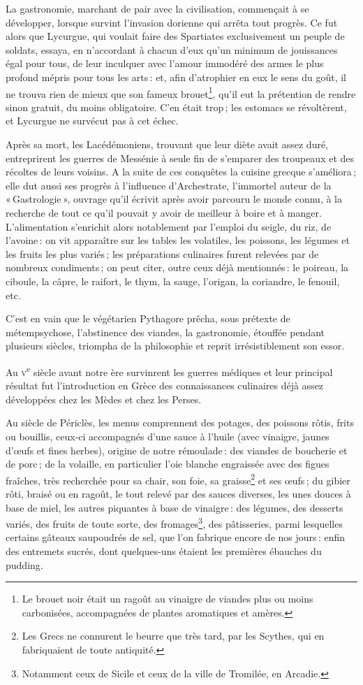 La gastronomie, marchant de pair avec la civilisation, commençait à se
développer, lorsque survint l'invasion dorienne qui arrêta tout progrès. Ce fut
alors que Lycurgue, qui voulait faire des Spartiates exclusivement un peuple de
soldats, essaya, en n'accordant à chacun d'eux qu'un minimum de jouissances
égal pour tous, de leur inculquer avec l'amour immodéré des armes le plus
profond mépris pour tous les arts : et, afin d'atrophier en eux le sens du
goût, il ne trouva rien de mieux que son fameux brouet\footnote{Le brouet noir
était un ragoût au vinaigre de viandes plus ou moins carbonisées, accompagnées
de plantes aromatiques et amères.}, qu'il eut la prétention de rendre sinon
gratuit, du moins obligatoire. C'en était trop ; les estomacs se révoltèrent, et
Lycurgue ne survécut pas à cet échec.

Après sa mort, les Lacédémoniens, trouvant que leur diète avait assez duré,
entreprirent les guerres de Messénie à seule fin de s'emparer des troupeaux et
des récoltes de leurs voisins. A la suite de ces conquêtes la cuisine grecque
s'améliora ; elle dut aussi ses progrès à l'influence d'Archestrate, l'immortel
auteur de la « Gastrologie », ouvrage qu'il écrivit après avoir parcouru le
monde connu, à la recherche de tout ce qu'il pouvait y avoir de meilleur
à boire et à manger. L'alimentation s'enrichit alors notablement par l'emploi
du seigle, du riz, de l’avoine : on vit apparaître sur les tables les
volatiles, les poissons, les légumes et les fruits les plus variés ; les
préparations culinaires furent relevées par de nombreux condiments ; on peut
citer, outre ceux déjà mentionnés : le poireau, la ciboule, la câpre, le
raifort, le thym, la sauge, l'origan, la coriandre, le fenouil, etc.

C'est en vain que le végétarien Pythagore prêcha, sous prétexte de
métempsychose, l'abstinence des viandes, la gastronomie, étouffée pendant
plusieurs siècles, triompha de la philosophie et reprit irrésistiblement son
essor.

Au \textsc{v}\textsuperscript{e} siècle avant notre ère survinrent les guerres
médiques et leur principal résultat fut l'introduction en Grèce des
connaissances culinaires déjà assez développées chez les Mèdes et chez les
Perses.

Au siècle de Périclès, les menus comprennent des potages, des poissons rôtis,
frits ou bouillis, ceux-ci accompagnés d'une sauce à l'huile (avec vinaigre,
jaunes d'œufs et fines herbes), origine de notre rémoulade : des viandes de
boucherie et de porc ; de la volaille, en particulier l'oie blanche engraissée
avec des figues fraîches, très recherchée pour sa chair, son foie, sa
graisse\footnote{Les Grecs ne connurent le beurre que très tard, par les
Scythes, qui en fabriquaient de toute antiquité.} et ses œufs ; du gibier rôti,
braisé ou en ragoût, le tout relevé par des sauces diverses, les unes douces
à base de miel, les autres piquantes à base de vinaigre : des légumes, des
desserts variés, des fruits de toute sorte, des fromages\footnote{Notamment
ceux de Sicile et ceux de la ville de Tromilée, en Arcadie.}, des pâtisseries,
parmi lesquelles certains gâteaux saupoudrés de sel, que l'on fabrique encore
de nos jours : enfin des entremets sucrés, dont quelques-uns étaient les
premières ébauches du pudding.

